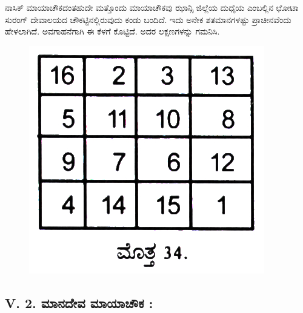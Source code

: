 ನಾಸಿಕ್ ಮಾಯಾಚೌಕದಂತಹುದೇ ಮತ್ತೊಂದು ಮಾಯಾಚೌಕವು ಝಾನ್ಸಿ ಜಿಲ್ಲೆಯ ದುಧೈಯ ಎಂಬಲ್ಲಿನ ಛೋಟಾ ಸುರಂಗ್ ದೇವಾಲಯದ ಚೌಕಟ್ಟಿನಲ್ಲಿರುವುದು ಕಂಡು ಬಂದಿದೆ. ಇದು ಅನೇಕ ಶತಮಾನಗಳಷ್ಟು ಪ್ರಾಚೀನವೆಂದು ಹೇಳಲಾಗಿದೆ. ಅವಗಾಹನೆಗಾಗಿ ಈ ಕೆಳಗೆ ಕೊಟ್ಟಿದೆ. ಅದರ ಲಕ್ಷಣಗಳನ್ನು ಗಮನಿಸಿ.
\begin{figure}[h]
\includegraphics{src/figures/chap4/fig4.7.jpg}
\end{figure}

\subsection*{V. 2. ಮಾನದೇವ ಮಾಯಾಚೌಕ :}

